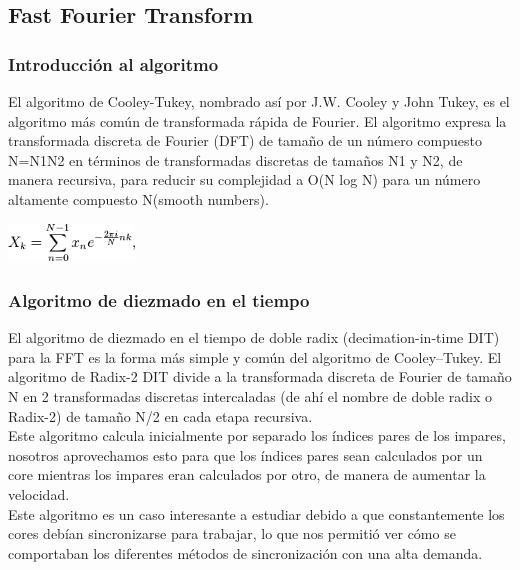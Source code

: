 \subsection{Fast Fourier Transform}
\subsubsection{Introducción al algoritmo}
El algoritmo de Cooley-Tukey, nombrado así por J.W. Cooley y John Tukey, es el algoritmo más común de transformada rápida de Fourier. El algoritmo expresa la transformada discreta de Fourier (DFT) de tamaño de un número compuesto N=N1N2 en términos de transformadas discretas de tamaños N1 y N2, de manera recursiva, para reducir su complejidad a O(N log N) para un número altamente compuesto N(smooth numbers). \\

\begin{center}
    \includegraphics[height=1cm]{images/fft_formula.png}
\end{center}

\subsubsection{Algoritmo de diezmado en el tiempo}

El algoritmo de diezmado en el tiempo de doble radix (decimation-in-time DIT) para la FFT es la forma más simple y común del algoritmo de Cooley–Tukey.
El algoritmo de Radix-2 DIT divide a la transformada discreta de Fourier de tamaño N en 2 transformadas discretas intercaladas (de ahí el nombre de doble radix o Radix-2) de tamaño N/2 en cada etapa recursiva.\\

Este algoritmo calcula inicialmente por separado los índices pares de los impares, nosotros aprovechamos esto para que los índices pares sean calculados por un core mientras los impares eran calculados por otro, de manera de aumentar la velocidad.\\

Este algoritmo es un caso interesante a estudiar debido a que constantemente los cores debían sincronizarse para trabajar, lo que nos permitió ver cómo se comportaban los diferentes métodos de sincronización con una alta demanda.\\

